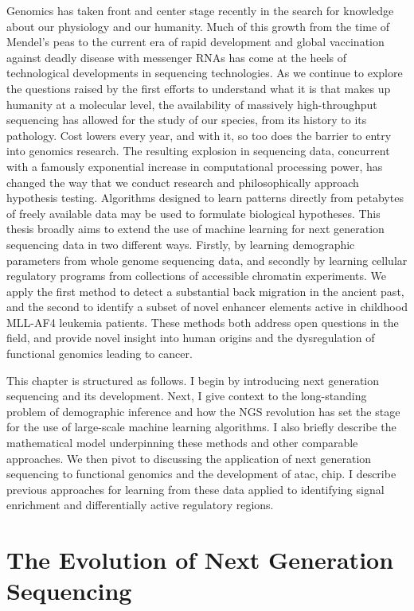 Genomics has taken front and center stage recently in the search for knowledge about our physiology and our humanity. Much of this growth from the time of Mendel's peas to the current era of rapid development and global vaccination against deadly disease with messenger RNAs has come at the heels of technological developments in sequencing technologies. As we continue to explore the questions raised by the first efforts to understand what it is that makes up humanity at a molecular level, the availability of massively high-throughput sequencing has allowed for the study of our species, from its history to its pathology. Cost lowers every year, and with it, so too does the barrier to entry into genomics research. The resulting explosion in sequencing data, concurrent with a famously exponential increase in computational processing power, has changed the way that we conduct research and philosophically approach hypothesis testing. Algorithms designed to learn patterns directly from petabytes of freely available data may be used to formulate biological hypotheses. This thesis broadly aims to extend the use of machine learning for next generation sequencing data in two different ways. Firstly, by learning demographic parameters from whole genome sequencing data, and secondly by learning cellular regulatory programs from collections of accessible chromatin experiments. We apply the first method to detect a substantial back migration in the ancient past, and the second to identify a subset of novel enhancer elements active in childhood MLL-AF4 leukemia patients. These methods both address open questions in the field, and provide novel insight into human origins and the dysregulation of functional genomics leading to cancer.

This chapter is structured as follows. I begin by introducing next generation sequencing and its development. Next, I give context to the long-standing problem of demographic inference and how the NGS revolution has set the stage for the use of large-scale machine learning algorithms. I also briefly describe the mathematical model underpinning these methods and other comparable approaches. We then pivot to discussing the application of next generation sequencing to functional genomics and the development of \gls{atac}, \gls{chip}.  I describe previous approaches for learning from these data applied to identifying signal enrichment and differentially active regulatory regions. 


\section{The Evolution of Next Generation Sequencing}

